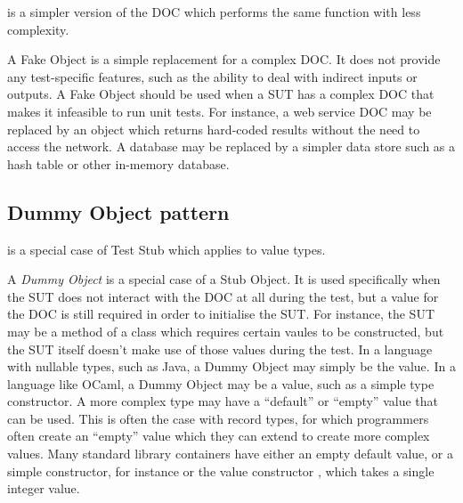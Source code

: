  is a simpler version of the DOC which
performs the same function with less complexity.

A Fake Object is a simple replacement for a complex DOC. It does not
provide any test-specific features, such as the ability to deal with
indirect inputs or outputs. A Fake Object should be used when a SUT
has a complex DOC that makes it infeasible to run unit tests. For
instance, a web service DOC may be replaced by an object which returns
hard-coded results without the need to access the network. A database
may be replaced by a simpler data store such as a hash table or other
in-memory database.


\subsection{Dummy Object pattern}
\label{testdoubles:dummy}

 is a special case of Test Stub which applies
to value types.

A \textit{Dummy Object} is a special case of a Stub Object. It is used
specifically when the SUT does not interact with the DOC at all during
the test, but a value for the DOC is still required in order to
initialise the SUT. For instance, the SUT may be a method of a class
which requires certain vaules to be constructed, but the SUT itself
doesn't make use of those values during the test. In a language with
nullable types, such as Java, a Dummy Object may simply be the
 value. In a language like OCaml, a Dummy Object may be a
value, such as a simple type constructor. A more complex type may have
a ``default'' or ``empty'' value that can be used. This is often the
case with record types, for which programmers often create an
``empty'' value which they can extend to create more complex
values. Many standard library containers have either an empty default
value, or a simple constructor, for instance  or the
value constructor , which takes a single integer
value.


